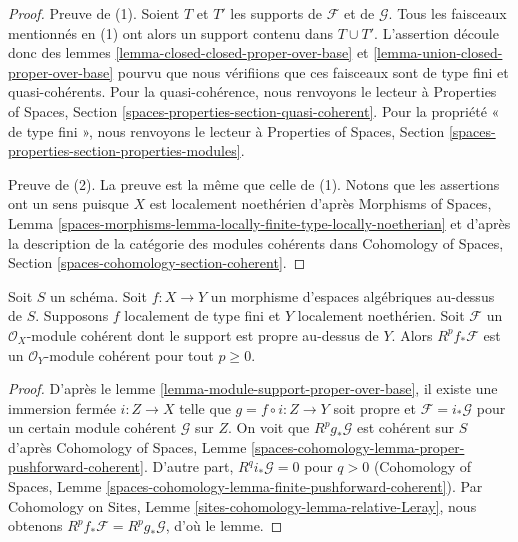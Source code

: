 \begin{proof}
Preuve de (1). Soient $T$ et $T'$ les supports de $\mathcal{F}$
et de $\mathcal{G}$. Tous les faisceaux mentionnés en (1)
ont alors un support contenu dans $T \cup T'$. L'assertion découle donc
des lemmes \ref{lemma-closed-closed-proper-over-base} et
\ref{lemma-union-closed-proper-over-base}
pourvu que nous vérifiions que ces faisceaux sont de type fini
et quasi-cohérents.
Pour la quasi-cohérence, nous renvoyons le lecteur à
Properties of Spaces, Section \ref{spaces-properties-section-quasi-coherent}.
Pour la propriété « de type fini », nous renvoyons le lecteur à
Properties of Spaces, Section
\ref{spaces-properties-section-properties-modules}.

\medskip\noindent
Preuve de (2). La preuve est la même que celle de (1). Notons que
les assertions ont un sens puisque $X$ est localement noethérien d'après
Morphisms of Spaces, Lemma
\ref{spaces-morphisms-lemma-locally-finite-type-locally-noetherian}
et d'après la description de la catégorie des modules cohérents dans
Cohomology of Spaces, Section \ref{spaces-cohomology-section-coherent}.
\end{proof}

\begin{lemma}
\label{lemma-support-proper-over-base-pushforward}
Soit $S$ un schéma. Soit $f : X \to Y$ un morphisme d'espaces algébriques
au-dessus de $S$. Supposons $f$ localement de type fini et $Y$ localement noethérien.
Soit $\mathcal{F}$ un $\mathcal{O}_X$-module cohérent dont le support
est propre au-dessus de $Y$. Alors $R^pf_*\mathcal{F}$ est un
$\mathcal{O}_Y$-module cohérent pour tout $p \geq 0$.
\end{lemma}

\begin{proof}
D'après le lemme \ref{lemma-module-support-proper-over-base},
il existe une immersion fermée $i : Z \to X$ telle que
$g = f \circ i : Z \to Y$ soit propre et
$\mathcal{F} = i_*\mathcal{G}$ pour un certain module cohérent $\mathcal{G}$
sur $Z$. On voit que $R^pg_*\mathcal{G}$
est cohérent sur $S$ d'après Cohomology of Spaces, Lemme
\ref{spaces-cohomology-lemma-proper-pushforward-coherent}.
D'autre part, $R^qi_*\mathcal{G} = 0$ pour $q > 0$
(Cohomology of Spaces, Lemme
\ref{spaces-cohomology-lemma-finite-pushforward-coherent}).
Par Cohomology on Sites, Lemme \ref{sites-cohomology-lemma-relative-Leray},
nous obtenons $R^pf_*\mathcal{F} = R^pg_*\mathcal{G}$, d'où le lemme.
\end{proof}







